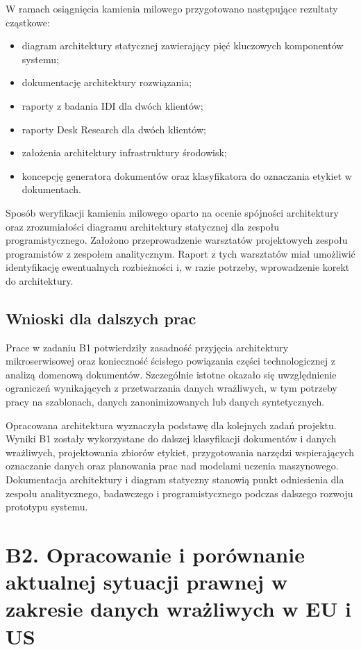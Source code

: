 \documentclass[12pt,a4paper]{report}
\begin{document}
W ramach osiągnięcia kamienia milowego przygotowano następujące rezultaty cząstkowe:

\begin{itemize}
    \item diagram architektury statycznej zawierający pięć kluczowych komponentów systemu;
    \item dokumentację architektury rozwiązania;
    \item raporty z badania IDI dla dwóch klientów;
    \item raporty Desk Research dla dwóch klientów;
    \item założenia architektury infrastruktury środowisk;
    \item koncepcję generatora dokumentów oraz klasyfikatora do oznaczania etykiet w dokumentach.
\end{itemize}

Sposób weryfikacji kamienia milowego oparto na ocenie spójności architektury oraz zrozumiałości diagramu architektury statycznej dla zespołu programistycznego. Założono przeprowadzenie warsztatów projektowych zespołu programistów z zespołem analitycznym. Raport z tych warsztatów miał umożliwić identyfikację ewentualnych rozbieżności i, w razie potrzeby, wprowadzenie korekt do architektury.

\subsection{Wnioski dla dalszych prac}
Prace w zadaniu B1 potwierdziły zasadność przyjęcia architektury mikroserwisowej oraz konieczność ścisłego powiązania części technologicznej z analizą domenową dokumentów. Szczególnie istotne okazało się uwzględnienie ograniczeń wynikających z przetwarzania danych wrażliwych, w tym potrzeby pracy na szablonach, danych zanonimizowanych lub danych syntetycznych.

Opracowana architektura wyznaczyła podstawę dla kolejnych zadań projektu. Wyniki B1 zostały wykorzystane do dalszej klasyfikacji dokumentów i danych wrażliwych, projektowania zbiorów etykiet, przygotowania narzędzi wspierających oznaczanie danych oraz planowania prac nad modelami uczenia maszynowego. Dokumentacja architektury i diagram statyczny stanowią punkt odniesienia dla zespołu analitycznego, badawczego i programistycznego podczas dalszego rozwoju prototypu systemu.



\section{B2. Opracowanie i porównanie aktualnej sytuacji prawnej w zakresie danych wrażliwych w EU i US}
\end{document}
